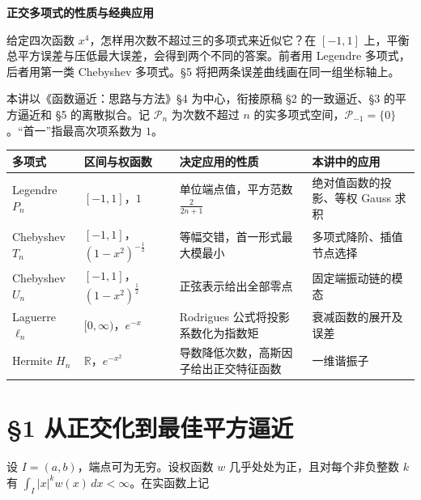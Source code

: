 \documentclass[11pt,a4paper]{article}
\newcommand{\lectureheading}[1]{\section{#1}}
\begin{document}
\begin{center}{\LARGE\bfseries 正交多项式的性质与经典应用\par}\vspace{6pt}{\large 从正交投影、零点交错到最优求积\par}\end{center}

给定四次函数 \(x^4\)，怎样用次数不超过三的多项式来近似它？在 \([-1,1]\) 上，平衡总平方误差与压低最大误差，会得到两个不同的答案。前者用 Legendre 多项式，后者用第一类 Chebyshev 多项式。§5 将把两条误差曲线画在同一组坐标轴上。

本讲以《函数逼近：思路与方法》§4 为中心，衔接原稿 §2 的一致逼近、§3 的平方逼近和 §5 的离散拟合。记 \(\mathcal P_n\) 为次数不超过 \(n\) 的实多项式空间，\(\mathcal P_{-1}=\{0\}\)。``首一''指最高次项系数为 \(1\)。

\medskip{}

\begin{center}\small\setlength{\tabcolsep}{4pt}\renewcommand{\arraystretch}{1.27}
\begin{tabular}{@{}p{.195\linewidth}p{.18\linewidth}p{.279\linewidth}p{.275\linewidth}@{}}\toprule
多项式 & 区间与权函数 & 决定应用的性质 & 本讲中的应用 \\ \midrule
Legendre \(P_n\) & \([-1,1]\)，\(1\) & 单位端点值，平方范数 \(\frac{2}{2n+1}\) & 绝对值函数的投影、等权 Gauss 求积 \\
Chebyshev \(T_n\) & \([-1,1]\)，\((1-x^2)^{-\frac{1}{2}}\) & 等幅交错，首一形式最大模最小 & 多项式降阶、插值节点选择 \\
Chebyshev \(U_n\) & \([-1,1]\)，\((1-x^2)^{\frac{1}{2}}\) & 正弦表示给出全部零点 & 固定端振动链的模态 \\
Laguerre \(\ell_n\) & \([0,\infty)\)，\(e^{-x}\) & Rodrigues 公式将投影系数化为指数矩 & 衰减函数的展开及误差 \\
Hermite \(H_n\) & \(\mathbb R\)，\(e^{-x^2}\) & 导数降低次数，高斯因子给出正交特征函数 & 一维谐振子 \\ \bottomrule\end{tabular}\end{center}

\begingroup\small\setlength{\parskip}{1pt}\tableofcontents\endgroup

\clearpage\lectureheading{§1 从正交化到最佳平方逼近}

设 \(I=(a,b)\)，端点可为无穷。设权函数 \(w\) 几乎处处为正，且对每个非负整数 \(k\) 有 \(\int_I |x|^k w(x)\,dx<\infty\)。在实函数上记
\end{document}
